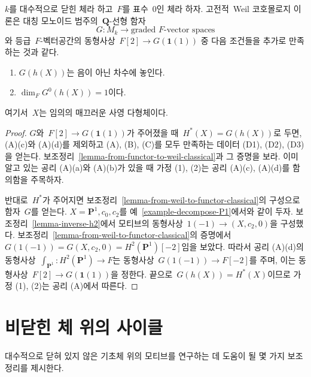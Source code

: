 \begin{proposition}
\label{proposition-weil-cohomology-theory-classical}
$k$를 대수적으로 닫힌 체라 하고\  $F$를 표수\  $0$인 체라 하자.
고전적\  Weil 코호몰로지 이론은 대칭 모노이드 범주의\ 
$\mathbf{Q}$-선형 함자
$$
G : M_k \longrightarrow \text{graded }F\text{-vector spaces}
$$
와 등급\  $F$-벡터공간의 동형사상\ 
$F[2] \to G(\mathbf{1}(1))$ 중 다음 조건들을 추가로 만족하는 것과 같다.
\begin{enumerate}
\item $G(h(X))$는 음이 아닌 차수에 놓인다.
\item $\dim_F G^0(h(X)) = 1$이다.
\end{enumerate}
여기서\  $X$는 임의의 매끄러운 사영 다형체이다.
\end{proposition}

\begin{proof}
$G$와\  $F[2] \to G(\mathbf{1}(1))$가 주어졌을 때\ 
$H^*(X) = G(h(X))$로 두면, (A)(c)와 (A)(d)를 제외하고
(A), (B), (C)를 모두 만족하는 데이터 (D1), (D2), (D3)을 얻는다.
보조정리\  \ref{lemma-from-functor-to-weil-classical}과 그 증명을 보라.
이미 알고 있는 공리 (A)(a)와 (A)(b)가 있을 때 가정 (1), (2)는
공리 (A)(c), (A)(d)를 함의함을 주목하자.

\medskip\noindent
반대로\  $H^*$가 주어지면 보조정리\ 
\ref{lemma-from-weil-to-functor-classical}의 구성으로 함자\  $G$를 얻는다.
$X = \mathbf{P}^1, c_0, c_2$를 예\ 
\ref{example-decompose-P1}에서와 같이 두자. 보조정리\ 
\ref{lemma-inverse-h2}에서 모티브의 동형사상\ 
$1(-1) \to (X, c_2, 0)$을 구성했다. 보조정리\ 
\ref{lemma-from-weil-to-functor-classical}의 증명에서\ 
$G(1(-1)) = G(X, c_2, 0) = H^2(\mathbf{P}^1)[-2]$임을 보았다.
따라서 공리 (A)(d)의 동형사상\ 
$\int_{\mathbf{P}^1} : H^2(\mathbf{P}^1) \to F$는 동형사상\ 
$G(1(-1)) \to F[-2]$를 주며, 이는 동형사상\ 
$F[2] \to G(\mathbf{1}(1))$을 정한다. 끝으로\ 
$G(h(X)) = H^*(X)$이므로 가정 (1), (2)는 공리 (A)에서 따른다.
\end{proof}










\section{비닫힌 체 위의 사이클}
\label{section-cycles-nonclosed}

\noindent
대수적으로 닫혀 있지 않은 기초체 위의 모티브를 연구하는 데 도움이 될
몇 가지 보조정리를 제시한다.

